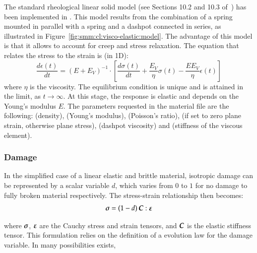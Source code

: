 The standard rheological linear solid model (see Sections 10.2 and 10.3
of~\cite{simo92}) has been implemented in \akantu. This model results from the
combination of a spring mounted in parallel with a spring and a dashpot
connected in series, as illustrated in
Figure~\ref{fig:smm:cl:visco-elastic:model}. The advantage of this model is that
it allows to account for creep and stress relaxation. The equation that relates
the stress to the strain is (in 1D):
\begin{equation}
  \frac{d\epsilon(t)}{dt} = \left ( E + E_V \right ) ^ {-1} \cdot \left [ \frac{d\sigma(t)}{dt} + \frac{E_V}{\eta}\sigma(t) - \frac{EE_V}{\eta}\epsilon(t) \right ]
\end{equation}
where $\eta$ is the viscosity. The equilibrium condition is unique and is
attained in the limit, as $t \to \infty $. At this stage, the response is
elastic and depends on the Young's modulus $E$.  The parameters requested in the
material file are the following:  (density),  (Young's
modulus),  (Poisson's ratio),  (if set to zero
plane strain, otherwise plane stress),  (dashpot viscosity) and
 (stiffness of the viscous element).

\subsubsection{Damage}

In the  simplified case of a  linear elastic and brittle  material, isotropic
damage can be represented by a scalar variable $d$, which varies from $0$ to $1$
for  no  damage  to  fully  broken  material  respectively.  The  stress-strain
relationship then becomes:
\begin{equation*}
  \boldsymbol{\sigma} = (1-d)\, \boldsymbol{C}:\boldsymbol{\varepsilon}
\end{equation*}

where  $\boldsymbol{\sigma}$,  $\boldsymbol{\varepsilon}$ are  the  Cauchy  stress and  strain
tensors, and $\boldsymbol{C}$ is the elastic stiffness tensor. This formulation relies
on the definition of a evolution law for the damage variable. In \akantu many
possibilities exists,


